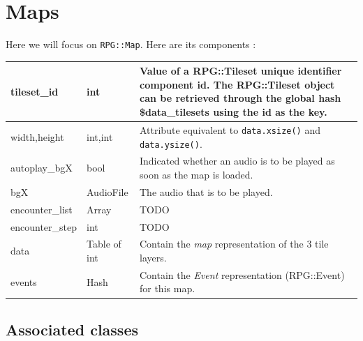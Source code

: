 \documentclass[11pt]{article}
\begin{document}
\newpage
\section{Maps}

Here we will focus on \verb|RPG::Map|. Here are its components :

\begin{tabular}{|a | l | l|}
	\hline
	{\ttfamily tileset\_id} & int & \parbox{.66\linewidth}{\vspace{.2\baselineskip}Value of a {\ttfamily RPG::Tileset} unique identifier component {\ttfamily id}. The {\ttfamily RPG::Tileset} object can be retrieved through the global hash {\ttfamily \$data\_tilesets} using the id as the key.} \\
	\hline
	{\ttfamily width,height} & int,int & Attribute equivalent to \verb|data.xsize()| and \verb|data.ysize()|. \\
	\hline
	{\ttfamily autoplay\_bgX} & bool & Indicated whether an audio is to be played as soon as the map is loaded. \\
	\hline
	{\ttfamily bgX} & AudioFile & The audio that is to be played. \\
	\hline
	{\ttfamily encounter\_list} & Array & TODO \\
	\hline
	{\ttfamily encounter\_step} & int & TODO \\
	\hline
	{\ttfamily data} & Table of int & Contain the \textit{map} representation of the 3 tile layers. \\
	\hline
	{\ttfamily events} & Hash & Contain the \textit{Event} representation ({\ttfamily RPG::Event}) for this map. \\
	\hline
\end{tabular}


\subsection{Associated classes}
\end{document}
